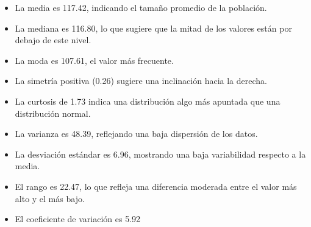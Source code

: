 \documentclass{article}
\begin{document}
\begin{itemize}
\begin{itemize}
\begin{figure}[H]
        \end{figure}
            \begin{itemize}
                \item La media es 117.42, indicando el tamaño promedio de la población.
                \item La mediana es 116.80, lo que sugiere que la mitad de los valores están por debajo de este nivel.
                \item La moda es 107.61, el valor más frecuente.
                \item La simetría positiva (0.26) sugiere una inclinación hacia la derecha.
                \item La curtosis de 1.73 indica una distribución algo más apuntada que una distribución normal.
                \item La varianza es 48.39, reflejando una baja dispersión de los datos.
                \item La desviación estándar es 6.96, mostrando una baja variabilidad respecto a la media.
                \item El rango es 22.47, lo que refleja una diferencia moderada entre el valor más alto y el más bajo.
                \item El coeficiente de variación es 5.92%
            \end{itemize}
    \end{itemize}
    

\end{itemize}
\end{document}
